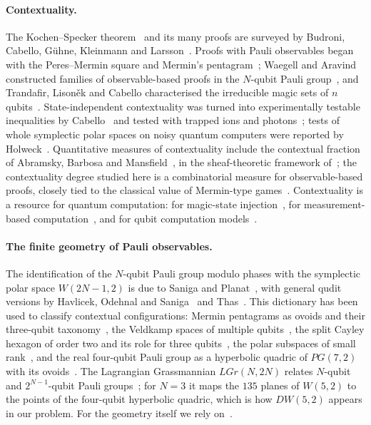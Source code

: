 \documentclass[11pt]{article}
\theoremstyle{definition}
\theoremstyle{remark}
\begin{document}
\paragraph{Contextuality.}
The Kochen--Specker theorem~\cite{KS67,Bell66} and its many proofs are surveyed by Budroni, Cabello, G\"uhne, Kleinmann and Larsson~\cite{Budroni22}.
Proofs with Pauli observables began with the Peres--Mermin square and Mermin's pentagram~\cite{Peres90,Mermin90,Mermin93}; Waegell and Aravind constructed families of observable-based proofs in the $N$-qubit Pauli group~\cite{Waegell13}, and Trandafir, Lison\v{e}k and Cabello characterised the irreducible magic sets of $n$ qubits~\cite{Trandafir22}.
State-independent contextuality was turned into experimentally testable inequalities by Cabello~\cite{Cabello08,Cabello10} and tested with trapped ions and photons~\cite{Kirchmair09,Amselem09}; tests of whole symplectic polar spaces on noisy quantum computers were reported by Holweck~\cite{Holweck21}.
Quantitative measures of contextuality include the contextual fraction of Abramsky, Barbosa and Mansfield~\cite{Abramsky17}, in the sheaf-theoretic framework of~\cite{Abramsky11}; the contextuality degree studied here is a combinatorial measure for observable-based proofs, closely tied to the classical value of Mermin-type games~\cite{Arkhipov12,Kelleher24}.
Contextuality is a resource for quantum computation: for magic-state injection~\cite{Howard14}, for measurement-based computation~\cite{Raussendorf13}, and for qubit computation models~\cite{BermejoVega17}.

\paragraph{The finite geometry of Pauli observables.}
The identification of the $N$-qubit Pauli group modulo phases with the symplectic polar space $W(2N-1,2)$ is due to Saniga and Planat~\cite{SanigaPlanat07}, with general qudit versions by Havlicek, Odehnal and Saniga~\cite{Havlicek09} and Thas~\cite{Thas09}.
This dictionary has been used to classify contextual configurations: Mermin pentagrams as ovoids and their three-qubit taxonomy~\cite{SanigaLevay12,LevaySzabo17}, the Veldkamp spaces of multiple qubits~\cite{VranaLevay10}, the split Cayley hexagon of order two and its role for three qubits~\cite{LevaySanigaVrana08,Planat13,Holweck22hex}, the polar subspaces of small rank~\cite{Saniga21}, and the real four-qubit Pauli group as a hyperbolic quadric of $PG(7,2)$ with its ovoids~\cite{SanigaLevayPracna12}.
The Lagrangian Grassmannian $LGr(N,2N)$ relates $N$-qubit and $2^{N-1}$-qubit Pauli groups~\cite{Holweck14,Levay13}; for $N=3$ it maps the $135$ planes of $W(5,2)$ to the points of the four-qubit hyperbolic quadric, which is how $DW(5,2)$ appears in our problem.
For the geometry itself we rely on~\cite{PayneThas09,HirschfeldThas16,Taylor92,DeBruyn06}.
\end{document}
